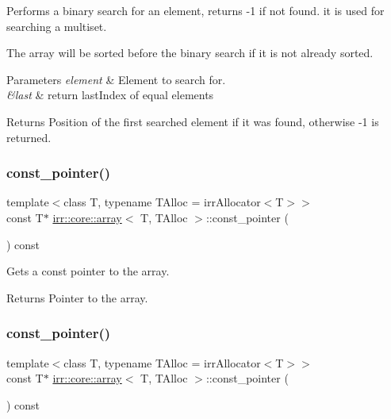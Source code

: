 Performs a binary search for an element, returns -\/1 if not found. it is used for searching a multiset. 

The array will be sorted before the binary search if it is not already sorted. 
\begin{DoxyParams}{Parameters}
{\em element} & Element to search for. \\
\hline
{\em \&last} & return last\+Index of equal elements \\
\hline
\end{DoxyParams}
\begin{DoxyReturn}{Returns}
Position of the first searched element if it was found, otherwise -\/1 is returned. 
\end{DoxyReturn}
\mbox{\label{classirr_1_1core_1_1array_a8df928a9e555327c085b20f392e409ee}} 
\subsubsection{\texorpdfstring{const\+\_\+pointer()}{const\_pointer()}\hspace{0.1cm}{\footnotesize\ttfamily [1/2]}}
{\footnotesize\ttfamily template$<$class T, typename T\+Alloc = irr\+Allocator$<$\+T$>$$>$ \\
const T$\ast$ \hyperlink{classirr_1_1core_1_1array}{irr\+::core\+::array}$<$ T, T\+Alloc $>$\+::const\+\_\+pointer (\begin{DoxyParamCaption}{ }\end{DoxyParamCaption}) const\hspace{0.3cm}{\ttfamily [inline]}}



Gets a const pointer to the array. 

\begin{DoxyReturn}{Returns}
Pointer to the array. 
\end{DoxyReturn}
\mbox{\label{classirr_1_1core_1_1array_a8df928a9e555327c085b20f392e409ee}} 
\subsubsection{\texorpdfstring{const\+\_\+pointer()}{const\_pointer()}\hspace{0.1cm}{\footnotesize\ttfamily [2/2]}}
{\footnotesize\ttfamily template$<$class T, typename T\+Alloc = irr\+Allocator$<$\+T$>$$>$ \\
const T$\ast$ \hyperlink{classirr_1_1core_1_1array}{irr\+::core\+::array}$<$ T, T\+Alloc $>$\+::const\+\_\+pointer (\begin{DoxyParamCaption}{ }\end{DoxyParamCaption}) const\hspace{0.3cm}{\ttfamily [inline]}}



